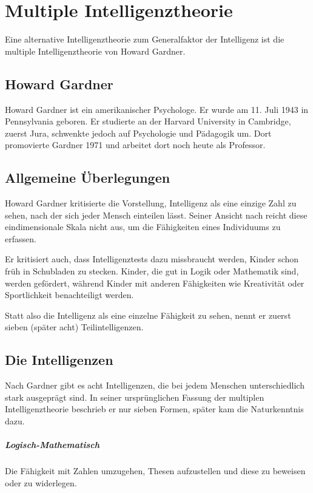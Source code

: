 \chapter{Multiple Intelligenztheorie}
Eine alternative Intelligenztheorie zum Generalfaktor der Intelligenz ist die multiple Intelligenztheorie von Howard Gardner.

\section{Howard Gardner}
Howard Gardner ist ein amerikanischer Psychologe. Er wurde am 11. Juli 1943 in Pennsylvania geboren. Er studierte an der Harvard University in Cambridge, zuerst Jura, schwenkte jedoch auf Psychologie und Pädagogik um. Dort promovierte Gardner 1971 und arbeitet dort noch heute als Professor. \cite{cv_gardner}

\section{Allgemeine Überlegungen}
Howard Gardner kritisierte die Vorstellung, Intelligenz als eine einzige Zahl zu sehen, nach der sich jeder Mensch einteilen lässt. Seiner Ansicht nach reicht diese eindimensionale Skala nicht aus, um die Fähigkeiten eines Individuums zu erfassen.

Er kritisiert auch, dass Intelligenztests dazu missbraucht werden, Kinder schon früh in \glqq Schubladen zu stecken\grqq{}. Kinder, die gut in Logik oder Mathematik sind, werden gefördert, während Kinder mit anderen Fähigkeiten wie Kreativität oder Sportlichkeit benachteiligt werden.

Statt also die Intelligenz als eine einzelne Fähigkeit zu sehen, nennt er zuerst sieben (später acht) Teilintelligenzen. \cite{gardner_mi}

\section{Die Intelligenzen}
Nach Gardner gibt es acht Intelligenzen, die bei jedem Menschen unterschiedlich stark ausgeprägt sind. In seiner ursprünglichen Fassung der multiplen Intelligenztheorie beschrieb er nur sieben Formen, später kam die Naturkenntnis dazu.
\paragraph{Logisch-Mathematisch}
Die Fähigkeit mit Zahlen umzugehen, Thesen aufzustellen und diese zu beweisen oder zu widerlegen.
